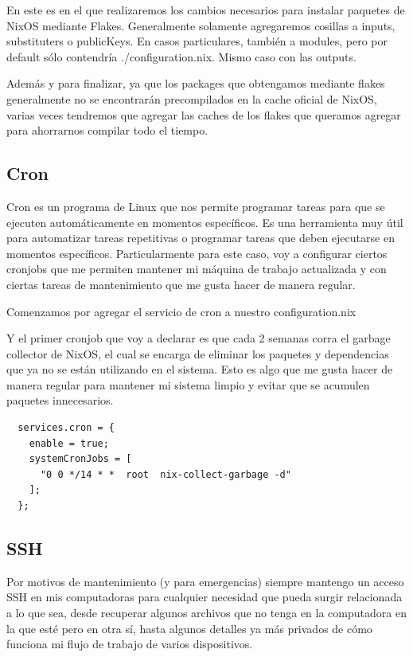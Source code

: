 \documentclass[11pt]{article}
\begin{document}
En este es en el que realizaremos los cambios necesarios para instalar paquetes de NixOS mediante Flakes. Generalmente solamente agregaremos cosillas a inputs, substituters o publicKeys. En casos particulares, también a modules, pero por default sólo contendría ./configuration.nix. Mismo caso con las outputs.

Además y para finalizar, ya que los packages que obtengamos mediante flakes generalmente no se encontrarán precompilados en la cache oficial de NixOS, varias veces tendremos que agregar las caches de los flakes que queramos agregar para ahorrarnos compilar todo el tiempo.
\subsection{Cron}
\label{sec:org974245a}

Cron es un programa de Linux que nos permite programar tareas para que se ejecuten automáticamente en momentos específicos. Es una herramienta muy útil para automatizar tareas repetitivas o programar tareas que deben ejecutarse en momentos específicos. Particularmente para este caso, voy a configurar ciertos cronjobs que me permiten mantener mi máquina de trabajo actualizada y con ciertas tareas de mantenimiento que me gusta hacer de manera regular.

Comenzamos por agregar el servicio de cron a nuestro configuration.nix

Y el primer cronjob que voy a declarar es que cada 2 semanas corra el garbage collector de NixOS, el cual se encarga de eliminar los paquetes y dependencias que ya no se están utilizando en el sistema. Esto es algo que me gusta hacer de manera regular para mantener mi sistema limpio y evitar que se acumulen paquetes innecesarios.

\begin{verbatim}
  services.cron = {
    enable = true;
    systemCronJobs = [
      "0 0 */14 * *  root  nix-collect-garbage -d"
    ];
  };

\end{verbatim}
\subsection{SSH}
\label{sec:org90bc905}

Por motivos de mantenimiento (y para emergencias) siempre mantengo un acceso SSH en mis computadoras para cualquier necesidad que pueda surgir relacionada a lo que sea, desde recuperar algunos archivos que no tenga en la computadora en la que esté pero en otra sí, hasta algunos detalles ya más privados de cómo funciona mi flujo de trabajo de varios dispositivos.
\end{document}
